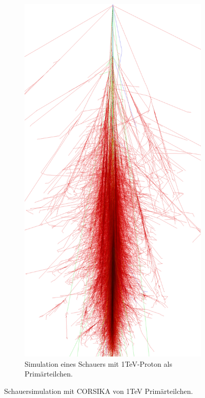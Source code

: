 \begin{figure}
\begin{subfigure}{0.4\textwidth}
 \end{subfigure}
 \hspace{2.0cm}
  \begin{subfigure}{0.4\textwidth}
  \includegraphics[width=\textwidth]{./Plots/03_MonteCarlos/Proton_1TeV_CORSIKA.png}
  \caption{Simulation eines Schauers mit 1TeV-Proton als Primärteilchen.}
 \end{subfigure}
  \caption{ Schauersimulation mit CORSIKA von 1TeV Primärteilchen.\cite{CORSIKA}}
  \label{CORSIKA_Schauer}
 \end{figure}



